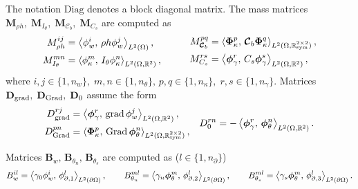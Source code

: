 The notation $\mathrm{Diag}$ denotes a block diagonal matrix. The mass matrices $\mathbf{M}_{\rho h}, \; \mathbf{M}_{I_\theta}, \; \mathbf{M}_{\bm{\mathcal{C}}_b}, \; \mathbf{M}_{{C}_s}$ are computed as
\begin{equation}
\begin{aligned}
M_{\rho h}^{ij} &= \inner[L^2(\Omega)]{\phi_w^i}{\rho h \phi_w^j}, \\
M_{I_\theta}^{mn} &= \inner[L^2(\Omega, \mathbb{R}^{2})]{\phi_\kappa^m}{I_\theta \phi_\kappa^n},
\end{aligned} \qquad
\begin{aligned}
\quad M_{\bm{\mathcal{C}}_b}^{pq} &= \inner[L^2(\Omega, \mathbb{R}^{2\times 2}_{\text{sym}})]{\bm\Phi_\kappa^p}{\bm{\mathcal{C}}_b \bm\Phi_\kappa^q}, \\
M_{C_s}^{rs} &= \inner[L^2(\Omega, \mathbb{R}^{2})]{\bm\phi_\gamma^r}{C_s \bm\phi_\gamma^s}, 
\end{aligned}
\end{equation}
where $i, j \in \{1, n_w\}, \; m, n \in \{1, n_\theta\}, \, p, q \in \{1, n_\kappa\}, \; r, s \in \{1, n_\gamma\}$. Matrices $\mathbf{D}_{\grad}, \; \mathbf{D}_{\Grad}, \; \mathbf{D}_{0}$ assume the form
\begin{equation}
\begin{aligned}
D_{\grad}^{rj} &= \inner[L^2(\Omega, \mathbb{R}^2)]{\bm\phi_\gamma^r}{\grad \phi_w^j}, \\ D_{\Grad}^{pn} &= \inner[L^2(\Omega, \mathbb{R}^{2\times 2}_{\text{sym}})]{\bm\Phi_\kappa^p}{\Grad \bm\phi_\theta^n},
\end{aligned} \quad
D_{0}^{rn} = -\inner[L^2(\Omega, \mathbb{R}^2)]{\bm\phi_\gamma^r}{\bm\phi_\theta^n}.
\end{equation}


Matrices $\mathbf{B}_w, \, \mathbf{B}_{\theta_n}, \, \mathbf{B}_{\theta_s}$ are computed as ($l \in \{1, n_\partial\}$)
\begin{equation}
{B}_w^{il} = \inner[L^2(\partial\Omega)]{\gamma_0 \phi_w^i}{\phi_{\partial, 1}^l}, \qquad {B}_{\theta_n}^{ml} = \inner[L^2(\partial\Omega)]{\gamma_n \bm\phi_\theta^m}{\phi_{\partial, 2}^l},  \qquad {B}_{\theta_s}^{ml} = \inner[L^2(\partial\Omega)]{\gamma_s \bm\phi_\theta^m}{\phi_{\partial, 3}^l}.
\end{equation}

